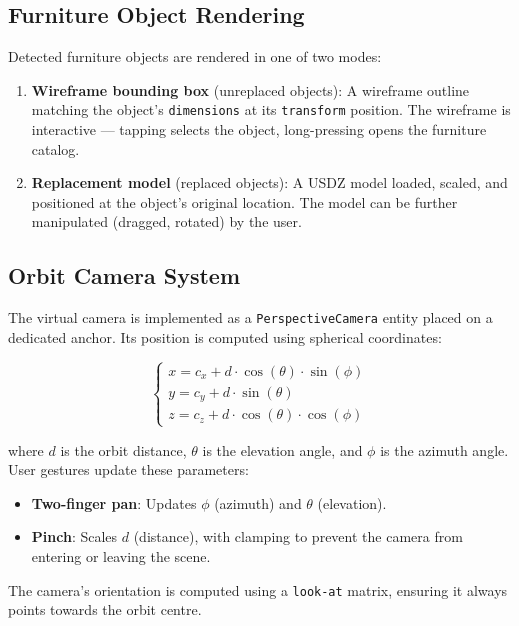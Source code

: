 \subsection{Furniture Object Rendering}

Detected furniture objects are rendered in one of two modes:

\begin{enumerate}
    \item \textbf{Wireframe bounding box} (unreplaced objects): A wireframe outline matching the object's \texttt{dimensions} at its \texttt{transform} position. The wireframe is interactive — tapping selects the object, long-pressing opens the furniture catalog.
    \item \textbf{Replacement model} (replaced objects): A USDZ model loaded, scaled, and positioned at the object's original location. The model can be further manipulated (dragged, rotated) by the user.
\end{enumerate}


\subsection{Orbit Camera System}

The virtual camera is implemented as a \texttt{PerspectiveCamera} entity placed on a dedicated anchor. Its position is computed using spherical coordinates:

\[
    \begin{cases}
        x = c_x + d \cdot \cos(\theta) \cdot \sin(\phi) \\
        y = c_y + d \cdot \sin(\theta) \\
        z = c_z + d \cdot \cos(\theta) \cdot \cos(\phi)
    \end{cases}
\]

where $d$ is the orbit distance, $\theta$ is the elevation angle, and $\phi$ is the azimuth angle. User gestures update these parameters:

\begin{itemize}
    \item \textbf{Two-finger pan}: Updates $\phi$ (azimuth) and $\theta$ (elevation).
    \item \textbf{Pinch}: Scales $d$ (distance), with clamping to prevent the camera from entering or leaving the scene.
\end{itemize}

The camera's orientation is computed using a \texttt{look-at} matrix, ensuring it always points towards the orbit centre.


